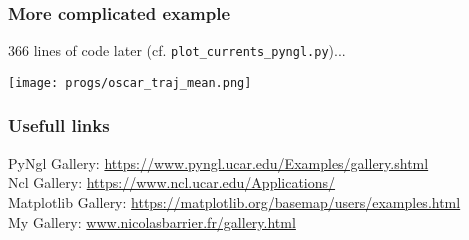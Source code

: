 \documentclass{beamer}
\begin{document}
\begin{frame}[fragile]
\frametitle{More complicated example}
    366 lines of code later (cf. \verb+plot_currents_pyngl.py+)...
    \begin{center}
    \texttt{[image: progs/oscar\_traj\_mean.png]}
    \end{center}
\end{frame}

\begin{frame}[fragile]
\frametitle{Usefull links}
\scriptsize
    PyNgl Gallery: \url{https://www.pyngl.ucar.edu/Examples/gallery.shtml}\\
    Ncl Gallery: \url{https://www.ncl.ucar.edu/Applications/}\\
    Matplotlib Gallery: \url{https://matplotlib.org/basemap/users/examples.html}\\
    My Gallery: \url{www.nicolasbarrier.fr/gallery.html}\\
\end{frame}
\end{document}
